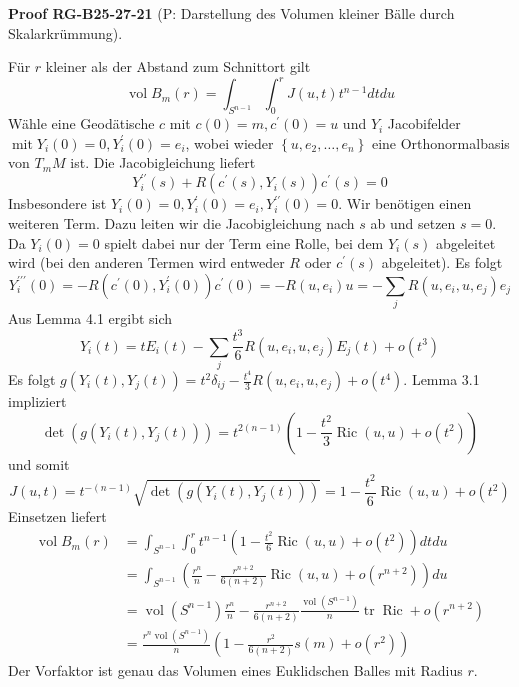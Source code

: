 \documentclass[10pt, letterpaper]{article}
\newcommand{\CustomHeading}[3]{%
  \par\medskip\noindent%
  \textbf{#1 #2} \textnormal{(#3)}.\enskip%
}
\newenvironment{PROOF}[2]{\begin{unitbox}\CustomHeading{Proof}{#1}{#2}}{\end{unitbox}}
\begin{document}
\begin{PROOF}{RG-B25-27-21}{P: Darstellung des Volumen kleiner Bälle durch Skalarkrümmung}
Für $r$ kleiner als der Abstand zum Schnittort gilt
$$
\operatorname{vol} B_{m}(r)=\int_{S^{n-1}} \int_{0}^{r} J(u, t) t^{n-1} d t d u
$$
Wähle eine Geodätische $c$ mit $c(0)=m, c^{\prime}(0)=u$ und $Y_{i}$ Jacobifelder $\operatorname{mit} Y_{i}(0)=0, Y_{i}^{\prime}(0)=e_{i}$, wobei wieder $\left\{u, e_{2}, \ldots, e_{n}\right\}$ eine Orthonormalbasis von $T_{m} M$ ist. Die Jacobigleichung liefert
$$
Y_{i}^{\prime \prime}(s)+R\left(c^{\prime}(s), Y_{i}(s)\right) c^{\prime}(s)=0
$$
Insbesondere ist $Y_{i}(0)=0, Y_{i}^{\prime}(0)=e_{i}, Y_{i}^{\prime \prime}(0)=0$. Wir benötigen einen weiteren Term. Dazu leiten wir die Jacobigleichung nach $s$ ab und setzen $s=0$. Da $Y_{i}(0)=0$ spielt dabei nur der Term eine Rolle, bei dem $Y_{i}(s)$ abgeleitet wird (bei den anderen Termen wird entweder $R$ oder $c^{\prime}(s)$ abgeleitet). Es folgt
$$
Y_{i}^{\prime \prime \prime}(0)=-R\left(c^{\prime}(0), Y_{i}^{\prime}(0)\right) c^{\prime}(0)=-R\left(u, e_{i}\right) u=-\sum_{j} R\left(u, e_{i}, u, e_{j}\right) e_{j}
$$
Aus Lemma 4.1 ergibt sich
$$
Y_{i}(t)=t E_{i}(t)-\sum_{j} \frac{t^{3}}{6} R\left(u, e_{i}, u, e_{j}\right) E_{j}(t)+o\left(t^{3}\right)
$$
Es folgt $g\left(Y_{i}(t), Y_{j}(t)\right)=t^{2} \delta_{i j}-\frac{t^{4}}{3} R\left(u, e_{i}, u, e_{j}\right)+o\left(t^{4}\right)$. Lemma 3.1 impliziert
$$
\operatorname{det}\left(g\left(Y_{i}(t), Y_{j}(t)\right)\right)=t^{2(n-1)}\left(1-\frac{t^{2}}{3} \operatorname{Ric}(u, u)+o\left(t^{2}\right)\right)
$$
und somit
$$
J(u, t)=t^{-(n-1)} \sqrt{\operatorname{det}\left(g\left(Y_{i}(t), Y_{j}(t)\right)\right)}=1-\frac{t^{2}}{6} \operatorname{Ric}(u, u)+o\left(t^{2}\right)
$$
Einsetzen liefert
$$
\begin{aligned}
\operatorname{vol} B_{m}(r) & =\int_{S^{n-1}} \int_{0}^{r} t^{n-1}\left(1-\frac{t^{2}}{6} \operatorname{Ric}(u, u)+o\left(t^{2}\right)\right) d t d u \\
& =\int_{S^{n-1}}\left(\frac{r^{n}}{n}-\frac{r^{n+2}}{6(n+2)} \operatorname{Ric}(u, u)+o\left(r^{n+2}\right)\right) d u \\
& =\operatorname{vol}\left(S^{n-1}\right) \frac{r^{n}}{n}-\frac{r^{n+2}}{6(n+2)} \frac{\operatorname{vol}\left(S^{n-1}\right)}{n} \operatorname{tr} \operatorname{Ric}+o\left(r^{n+2}\right) \\
& =\frac{r^{n} \operatorname{vol}\left(S^{n-1}\right)}{n}\left(1-\frac{r^{2}}{6(n+2)} s(m)+o\left(r^{2}\right)\right)
\end{aligned}
$$
Der Vorfaktor ist genau das Volumen eines Euklidschen Balles mit Radius $r$.
\end{PROOF}
\end{document}

